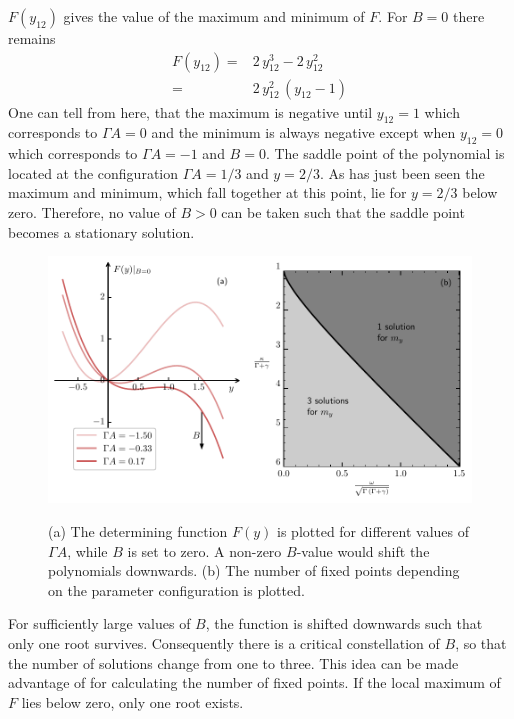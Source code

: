 $F(y_{12})$ gives the value of the maximum and minimum of $F$. For $B=0$ there remains
\begin{align*}
    F(y_{12})=&2\,y_{12}^3-2\,y_{12}^2\\
    =&2\,y_{12}^2\,(y_{12}-1)
\end{align*}
One can tell from here, that the maximum is negative until $y_{12}=1$ which corresponds to $\Gamma A =0$ and the minimum is always negative except when $y_{12}=0$ which corresponds to $\Gamma A=-1$ and $B=0$. The saddle point of the polynomial is located at the configuration $\Gamma A=1/3$ and $y=2/3$. As has just been seen the maximum and minimum, which fall together at this point, lie for $y=2/3$ below zero. Therefore, no value of $B>0$ can be taken such that the saddle point becomes a stationary solution.  
\begin{figure}[H]
    \centering
    \caption{(a) The determining function $F(y)$ is plotted for different values of $\Gamma A$, while $B$ is set to zero. A non-zero $B$-value would shift the polynomials downwards. (b) The number of fixed points depending on the parameter configuration is plotted.}
    \includegraphics{pictures/polynomial_scheme_phase.pdf}
    \label{fig:numb_fixp}
\end{figure}
For sufficiently large values of $B$, the function is shifted downwards such that only one root survives. Consequently there is a critical constellation of $B$, so that the number of solutions change from one to three. This idea can be made advantage of for calculating the number of fixed points. If the local maximum of $F$ lies below zero, only one root exists.
